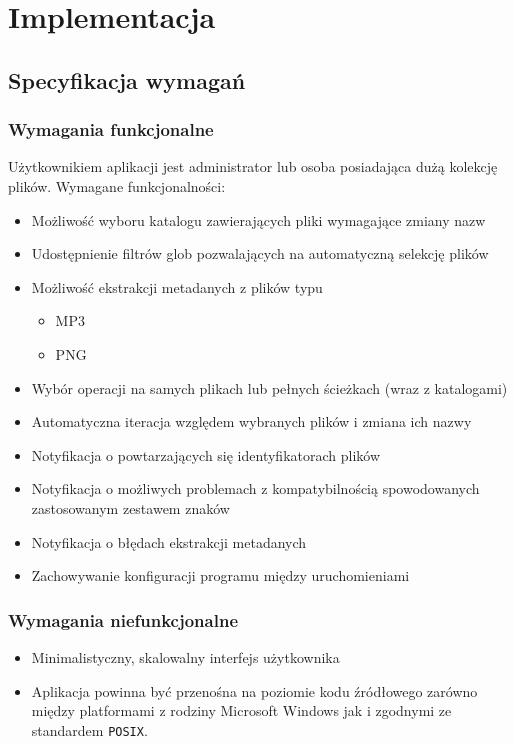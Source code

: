 \chapter{Implementacja}

\section{Specyfikacja wymagań}
\subsection{Wymagania funkcjonalne}
Użytkownikiem aplikacji jest administrator lub osoba posiadająca dużą kolekcję plików.
Wymagane funkcjonalności:
\begin{itemize}
\item Możliwość wyboru katalogu zawierających pliki wymagające zmiany nazw
\item Udostępnienie filtrów glob pozwalających na automatyczną selekcję plików
\item Możliwość ekstrakcji metadanych z plików typu
  \begin{itemize}
  \item MP3
  \item PNG
  \end{itemize}
\item Wybór operacji na samych plikach lub pełnych ścieżkach (wraz z katalogami)
\item Automatyczna iteracja względem wybranych plików i zmiana ich nazwy
\item Notyfikacja o powtarzających się identyfikatorach plików
\item Notyfikacja o możliwych problemach z kompatybilnością spowodowanych zastosowanym zestawem znaków
\item Notyfikacja o błędach ekstrakcji metadanych
\item Zachowywanie konfiguracji programu między uruchomieniami
\end{itemize}

\subsection{Wymagania niefunkcjonalne}
\begin{itemize}
\item Minimalistyczny, skalowalny interfejs użytkownika
\item Aplikacja powinna być przenośna na poziomie kodu źródłowego zarówno między platformami z rodziny Microsoft Windows jak i zgodnymi ze standardem \texttt{POSIX}.
\end{itemize}

